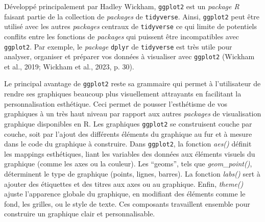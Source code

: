 \documentclass[
  letterpaper,
  DIV=11,
  numbers=noendperiod]{scrreprt}
\begin{document}
Développé principalement par Hadley Wickham, \texttt{ggplot2} est un
\emph{package R} faisant partie de la collection de \emph{packages} de
\texttt{tidyverse}. Ainsi, \texttt{ggplot2} peut être utilisé avec les
autres \emph{packages} centraux de \texttt{tidyverse} ce qui limite de
potentiels conflits entre les fonctions de \emph{packages} qui puissent
être incompatibles avec \texttt{ggplot2}. Par exemple, le \emph{package}
\texttt{dplyr} de \texttt{tidyverse} est très utile pour analyser,
organiser et préparer vos données à visualiser avec \texttt{ggplot2}
(Wickham et al., 2019; Wickham et al., 2023, p. 30).

Le principal avantage de \texttt{ggplot2} reste sa grammaire qui permet
à l'utilisateur de rendre ses graphiques beaucoup plus visuellement
attrayants en facilitant la personnalisation esthétique. Ceci permet de
pousser l'esthétisme de vos graphiques à un très haut niveau par rapport
aux autres \emph{packages} de visualisation graphique disponibles en R.
Les graphiques \texttt{ggplot2} se construisent couche par couche, soit
par l'ajout des différents éléments du graphique au fur et à mesure dans
le code du graphique à construire. Dans \texttt{ggplot2}, la fonction
\emph{aes()} définit les mappings esthétiques, liant les variables des
données aux éléments visuels du graphique (comme les axes ou la
couleur). Les ``geoms'', tels que \emph{geom\_point()}, déterminent le
type de graphique (points, lignes, barres). La fonction \emph{labs()}
sert à ajouter des étiquettes et des titres aux axes ou au graphique.
Enfin, \emph{theme()} ajuste l'apparence globale du graphique, en
modifiant des éléments comme le fond, les grilles, ou le style de texte.
Ces composants travaillent ensemble pour construire un graphique clair
et personnalisable.
\end{document}
